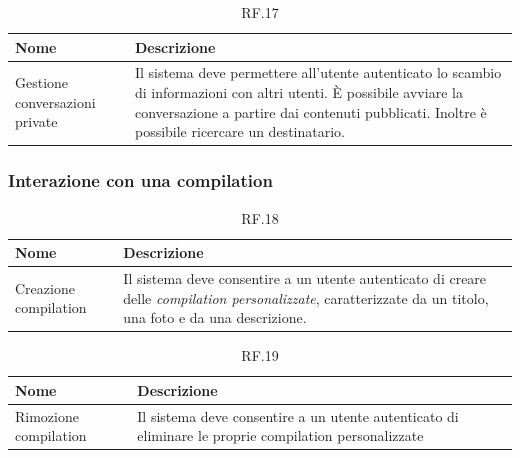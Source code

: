 \documentclass{natourDoc}
\begin{document}
\begin{table}[H]
	\centering
	\begin{tabular}{ |p{5cm}|p{10.3cm}| }
		\hline
		\rowcolor{PineGreen!70}
		\textbf{Nome}                  & \textbf{Descrizione}                                                                           \\
		\hline
		Gestione conversazioni private & Il sistema deve permettere all'utente autenticato lo scambio di informazioni con altri utenti.
		È possibile avviare la conversazione a partire dai contenuti pubblicati. Inoltre è possibile ricercare un destinatario.         \\
		\hline
	\end{tabular}
	\caption{RF.17}

\end{table}

\subsubsection{Interazione con una compilation}
\begin{table}[H]
	\centering
	\begin{tabular}{ |p{5cm}|p{10.3cm}| }
		\hline
		\rowcolor{PineGreen!70}
		\textbf{Nome}         & \textbf{Descrizione}                                                                                    \\
		\hline
		Creazione compilation & Il sistema deve consentire a un utente autenticato di creare delle \textit{compilation personalizzate},
		caratterizzate da un titolo, una foto e da una descrizione.                                                                     \\
		\hline
	\end{tabular}
	\caption{RF.18}

\end{table}

\begin{table}[H]
	\centering
	\begin{tabular}{ |p{5cm}|p{10.3cm}| }
		\hline
		\rowcolor{PineGreen!70}
		\textbf{Nome}         & \textbf{Descrizione}                                                       \\
		\hline
		Rimozione compilation & Il sistema deve consentire a un utente autenticato di eliminare le proprie
		compilation personalizzate                                                                         \\
		\hline
	\end{tabular}
	\caption{RF.19}

\end{table}
\end{document}
